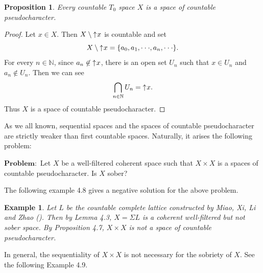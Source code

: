 \documentclass[preprint,12pt]{elsarticle}
\numberwithin{equation}{section}
\newtheorem{proposition}[theorem]{Proposition}
\newtheorem{example}[theorem]{Example}
\newcommand{\up}{\mathord{\uparrow}\hspace{0.05em}}
\begin{document}
\begin{proposition} {\rm Every countable $T_{0}$ space $X$ is a space of countable pseudocharacter.}
\end{proposition}

\begin{proof} Let $x\in X$. Then $X\setminus \up x$ is countable and set
$$X\setminus \up x=\{a_{0},a_{1},\cdot\cdot\cdot,a_{n},\cdot\cdot\cdot\}.$$
For every $n\in\mathbb{N}$, since $a_{n}\not\in\up x$, there is an open set $U_{n}$ such that $x\in U_{n}$ and $a_{n}\not\in U_{n}$. Then we can see
$$\bigcap\limits_{n\in\mathbb{N}}U_{n}=\up x.$$ Thus $X$ is a space of countable pseudocharacter.
\end{proof}

As we all known, sequential spaces and the spaces of countable pseudocharacter are strictly weaker than first countable spaces. Naturally, it arises the following problem:

\vspace*{0.2cm}
$\mathbf{Problem:}$ Let $X$ be a well-filtered coherent space such that $X\times X$ is a spaces of countable pseudocharacter. Is $X$ sober?
\vspace*{0.2cm}

The following example 4.8 gives a negative solution for the above problem.


\begin{example} {\rm Let $L$ be the countable complete lattice constructed by Miao, Xi, Li and Zhao (\cite{AB75}). Then by Lemma 4.3, $X=\Sigma L$ is a coherent well-filtered but not sober space. By Proposition 4.7, $X\times X$ is not a space of countable pseudocharacter.}
\end{example}

In general, the sequentiality of $X\times X$ is not necessary for the sobriety of $X$. See the following Example 4.9.
\end{document}

